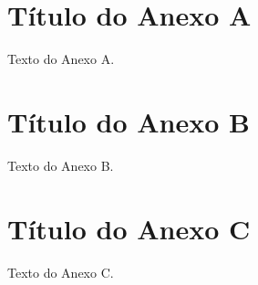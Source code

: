 
\begin{anexosenv}
	
	\partanexos* %

	\chapter{Título do Anexo A}
	
	Texto do Anexo A.
	
	
	
	\chapter{Título do Anexo B}
	
	Texto do Anexo B.
	
	
	
	\chapter{Título do Anexo C}
	
	Texto do Anexo C.
	
	
	
\end{anexosenv}